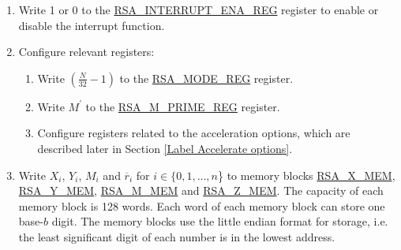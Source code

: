 \documentclass[main\_\_EN.tex]{subfiles}
\begin{document}
\begin{enumerate}

    \item Write 1 or 0 to the \hyperref[regdesc:RSAINTERRUPTENAREG]{RSA\_INTERRUPT\_ENA\_REG} register to enable or disable the interrupt function.

    \item Configure relevant registers:

    \begin{enumerate}
        \item Write \begin{math}( \frac{N}{32} - 1 )\end{math} to the \hyperref[regdesc:RSAMODEREG]{RSA\_MODE\_REG} register.

        \item Write \begin{math}M^{\prime}\end{math} to the \hyperref[regdesc:RSAMPRIMEREG]{RSA\_M\_PRIME\_REG} register.

        \item Configure registers related to the acceleration options, which are described later in Section \ref{Label Accelerate options}.

    \end{enumerate}

    \item Write
        \begin{math}X_{i}\end{math},
        \begin{math}Y_{i}\end{math},
        \begin{math}M_{i}\end{math} and
        \begin{math}\overline{r}_{i}\end{math} for \begin{math}i \in \{ 0, 1, \dots, n \end{math}\}
        to memory blocks \hyperref[regdesc:RSAmemory]{RSA\_X\_MEM}, \hyperref[regdesc:RSAmemory]{RSA\_Y\_MEM}, \hyperref[regdesc:RSAmemory]{RSA\_M\_MEM} and \hyperref[regdesc:RSAmemory]{RSA\_Z\_MEM}. The capacity of each memory block is 128 words. Each word of each memory block can store one base-\begin{math}b\end{math} digit. The memory blocks use the little endian format for storage, i.e. the least significant digit of each number is in the lowest address.


\end{enumerate}
\end{document}
